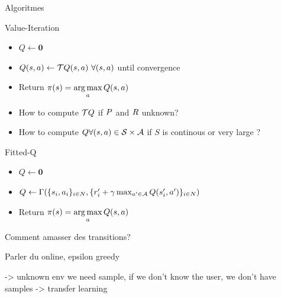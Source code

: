 \documentclass[french]{beamer}
\begin{document}
    \begin{frame}{Algoritmes}

        \begin{block}{Value-Iteration}
            \begin{itemize}
                \item $Q \leftarrow \mathbf{0}$
                \item $Q(s,a) \leftarrow \mathcal{T} Q(s,a)\ \forall (s,a)$ until convergence
                \item Return $\pi(s) = \operatorname*{arg\,max}\limits_{a} Q(s,a)$
            \end{itemize}
        \end{block}

        \begin{alertblock}{}
            \begin{itemize}
                \item How to compute $\mathcal{T} Q$ if $P$ and $R$ unknown?
                \item How to compute $Q \forall (s,a) \in \mathcal{S}\times\mathcal{A}$ if $S$ is continous or very large ?
            \end{itemize}

        \end{alertblock}

        \begin{block}{Fitted-Q}
            \begin{itemize}
                \item $Q \leftarrow \mathbf{0}$
                \item $Q \leftarrow \Gamma(\{s_{i},a_{i}\}_{{i}\in N},\{r'_{i} + \gamma  \max_{a'\in\mathcal{A}} Q(s'_i,a')\}_{{i} \in N})$
                \item Return $\pi(s) = \operatorname*{arg\,max}\limits_{a} Q(s,a)$
            \end{itemize}
        \end{block}


    \end{frame}

    \begin{frame}{Comment amasser des transitions?}

        Parler du online, epsilon greedy


        -> unknown env we need sample, if we don't know the user, we don't have samples -> transfer learning

    \end{frame}
\end{document}
